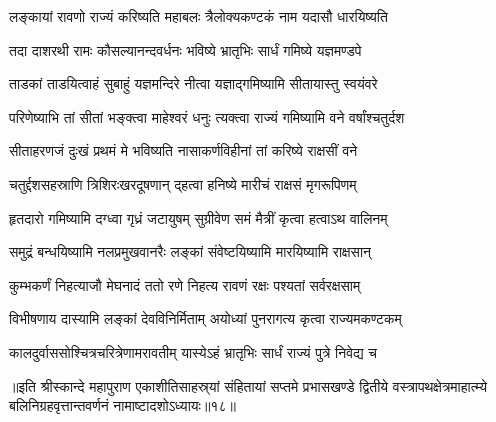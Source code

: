 
\tags{}

\storymeta

\addtocounter{shlokacount}{180}

\twolineshloka
{लङ्कायां रावणो राज्यं करिष्यति महाबलः}
{त्रैलोक्यकण्टकं नाम यदासौ धारयिष्यति}%

\twolineshloka
{तदा दाशरथी रामः कौसल्यानन्दवर्धनः}
{भविष्ये भ्रातृभिः सार्धं गमिष्ये यज्ञमण्डपे}%

\twolineshloka
{ताडकां ताडयित्वाहं सुबाहुं यज्ञमन्दिरे}
{नीत्वा यज्ञाद्गमिष्यामि सीतायास्तु स्वयंवरे}%

\twolineshloka
{परिणेष्याभि तां सीतां भङ्क्त्वा माहेश्वरं धनुः}
{त्यक्त्वा राज्यं गमिष्यामि वने वर्षांश्चतुर्दश}%

\twolineshloka
{सीताहरणजं दुःखं प्रथमं मे भविष्यति}
{नासाकर्णविहीनां तां करिष्ये राक्षसीं वने}%

\twolineshloka
{चतुर्द्दशसहस्राणि त्रिशिरःखरदूषणान्}
{द्हत्वा हनिष्ये मारीचं राक्षसं मृगरूपिणम्}%

\twolineshloka
{हृतदारो गमिष्यामि दग्ध्वा गृध्रं जटायुषम्}
{सुग्रीवेण समं मैत्रीं कृत्वा हत्वाऽथ वालिनम्}%

\twolineshloka
{समुद्रं बन्धयिष्यामि नलप्रमुखवानरैः}
{लङ्कां संवेष्टयिष्यामि मारयिष्यामि राक्षसान्}%

\twolineshloka
{कुम्भकर्णं निहत्याजौ मेघनादं ततो रणे}
{निहत्य रावणं रक्षः पश्यतां सर्वरक्षसाम्}%

\twolineshloka
{विभीषणाय दास्यामि लङ्कां देवविनिर्मिताम्}
{अयोध्यां पुनरागत्य कृत्वा राज्यमकण्टकम्}%

\twolineshloka
{कालदुर्वाससोश्चित्रचरित्रेणामरावतीम्}
{यास्येऽहं भ्रातृभिः सार्धं राज्यं पुत्रे निवेद्य च}%

॥इति श्रीस्कान्दे महापुराण एकाशीतिसाहस्र्यां संहितायां सप्तमे प्रभासखण्डे द्वितीये वस्त्रापथक्षेत्रमाहात्म्ये बलिनिग्रहवृत्तान्तवर्णनं नामाष्टादशोऽध्यायः॥१८॥

\closesection